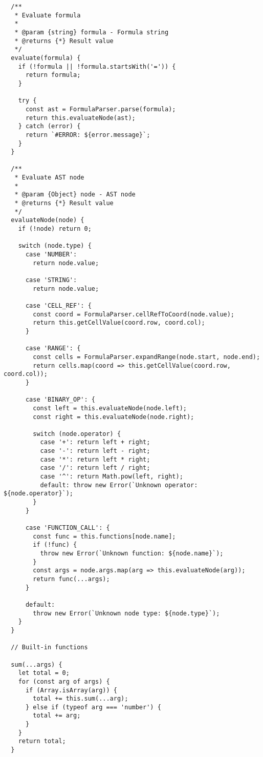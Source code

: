 \documentclass[11pt]{article}
\begin{document}
\begin{verbatim}
  /**
   * Evaluate formula
   * 
   * @param {string} formula - Formula string
   * @returns {*} Result value
   */
  evaluate(formula) {
    if (!formula || !formula.startsWith('=')) {
      return formula;
    }
    
    try {
      const ast = FormulaParser.parse(formula);
      return this.evaluateNode(ast);
    } catch (error) {
      return `#ERROR: ${error.message}`;
    }
  }
  
  /**
   * Evaluate AST node
   * 
   * @param {Object} node - AST node
   * @returns {*} Result value
   */
  evaluateNode(node) {
    if (!node) return 0;
    
    switch (node.type) {
      case 'NUMBER':
        return node.value;
        
      case 'STRING':
        return node.value;
        
      case 'CELL_REF': {
        const coord = FormulaParser.cellRefToCoord(node.value);
        return this.getCellValue(coord.row, coord.col);
      }
      
      case 'RANGE': {
        const cells = FormulaParser.expandRange(node.start, node.end);
        return cells.map(coord => this.getCellValue(coord.row, coord.col));
      }
      
      case 'BINARY_OP': {
        const left = this.evaluateNode(node.left);
        const right = this.evaluateNode(node.right);
        
        switch (node.operator) {
          case '+': return left + right;
          case '-': return left - right;
          case '*': return left * right;
          case '/': return left / right;
          case '^': return Math.pow(left, right);
          default: throw new Error(`Unknown operator: ${node.operator}`);
        }
      }
      
      case 'FUNCTION_CALL': {
        const func = this.functions[node.name];
        if (!func) {
          throw new Error(`Unknown function: ${node.name}`);
        }
        const args = node.args.map(arg => this.evaluateNode(arg));
        return func(...args);
      }
      
      default:
        throw new Error(`Unknown node type: ${node.type}`);
    }
  }
  
  // Built-in functions
  
  sum(...args) {
    let total = 0;
    for (const arg of args) {
      if (Array.isArray(arg)) {
        total += this.sum(...arg);
      } else if (typeof arg === 'number') {
        total += arg;
      }
    }
    return total;
  }
  

\end{verbatim}
\end{document}
